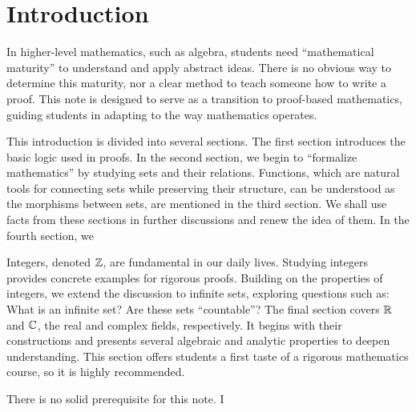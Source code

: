 \documentclass[10pt]{article}
\begin{document}
\def\htitle{An Introduction to Proofs}
\def\hauthor{Hassium}
\hsetup
\htoc
\hmain
\section*{Introduction}
In higher-level mathematics, such as algebra, students need ``mathematical maturity'' to understand and apply abstract ideas. There is no obvious way to determine this maturity, nor a clear method to teach someone how to write a proof. This note is designed to serve as a transition to proof-based mathematics, guiding students in adapting to the way mathematics operates.
\par
This introduction is divided into several sections. The first section introduces the basic logic used in proofs. In the second section, we begin to “formalize mathematics” by studying sets and their relations. Functions, which are natural tools for connecting sets while preserving their structure, can be understood as the morphisms between sets, are mentioned in the third section. We shall use facts from these sections in further discussions and renew the idea of them. In the fourth section, we

Integers, denoted $\mathbb{Z}$, are fundamental in our daily lives. Studying integers provides concrete examples for rigorous proofs. Building on the properties of integers, we extend the discussion to infinite sets, exploring questions such as: What is an infinite set? Are these sets “countable”? The final section covers $\mathbb{R}$ and $\mathbb{C}$, the real and complex fields, respectively. It begins with their constructions and presents several algebraic and analytic properties to deepen understanding. This section offers students a first taste of a rigorous mathematics course, so it is highly recommended.
\par
There is no solid prerequisite for this note. I 



\pagebreak
\end{document}
